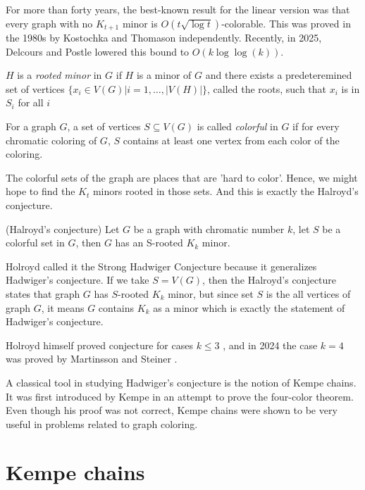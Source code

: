 For more than forty years, the best-known result for the linear version was that every graph with no $K_{t+1}$ minor is $O(t \sqrt{\log t})$-colorable.
This was proved in the 1980s by Kostochka \cite{Kostochka1984} and Thomason \cite{Thomason_1984} independently.
Recently, in 2025, Delcours and Postle \cite{JAMS2025} lowered this bound to $O(k \log \log(k))$.

\begin{defn}
    $H$ is a \textit{rooted minor} in $G$ if $H$ is a minor of $G$ and there exists a predeteremined set of vertices
    $\{x_i \in V(G) | i = 1, \dots, |V(H)|\}$, called the roots, such that $x_i$ is in $S_i$ for all $i$
\end{defn}

\begin{defn}
 For a graph $G$, a set of vertices $S \subseteq V(G)$ is called \textit{colorful} in $G$ if for every chromatic coloring of $G$, $S$ contains at least one 
 vertex from each color of the coloring.
\end{defn}

The colorful sets of the graph are places that are 'hard to color'. Hence, we might hope to find the $K_{t}$ minors rooted in those sets. And this is 
exactly the Halroyd's conjecture.

\begin{conj} (Halroyd's conjecture)
 Let $G$ be a graph with chromatic number $k$, let $S$ be a colorful set in $G$, then $G$ has an S-rooted $K_k$ minor. 
\end{conj}

Holroyd called it the Strong Hadwiger Conjecture because it generalizes Hadwiger's conjecture. If we take $S = V(G)$,
then the Halroyd's conjecture states that graph $G$ has $S$-rooted $K_k$ minor, but since set $S$ is the all vertices of graph $G$, it means $G$ contains $K_k$ as a minor
which is exactly the statement of Hadwiger's conjecture.

Holroyd himself proved conjecture for cases $k \leq 3$ \cite{Holroyd1997}, and in 2024  the case
$k = 4$ was proved by Martinsson and Steiner \cite{MARTINSSON20241}.

A classical tool in studying Hadwiger's conjecture is the notion of Kempe chains. It was first introduced by Kempe in an attempt
to prove the four-color theorem. Even though his proof was not correct, Kempe chains were shown to be very useful in problems 
related to graph coloring.

\section{Kempe chains}

